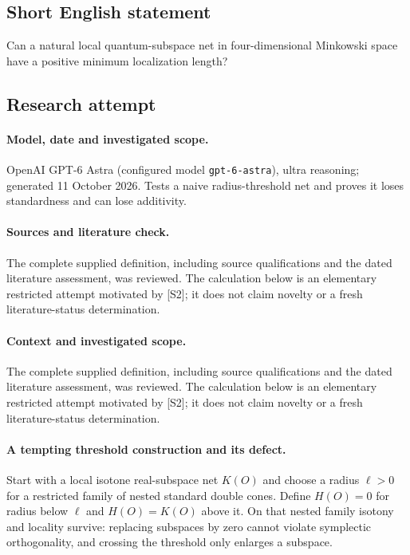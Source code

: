 \documentclass[11pt]{article}
\begin{document}
\subsection{Short English statement}
Can a natural local quantum-subspace net in four-dimensional Minkowski space have a positive minimum localization length?
\subsection{Research attempt}
\paragraph{Model, date and investigated scope.}
OpenAI GPT-6 Astra (configured model \texttt{gpt-6-astra}), ultra reasoning; generated 11 October 2026. Tests a naive radius-threshold net and proves it loses standardness and can lose additivity.

\paragraph{Sources and literature check.}
The complete supplied definition, including source qualifications and the dated literature assessment, was reviewed. The calculation below is an elementary restricted attempt motivated by [S2]; it does not claim novelty or a fresh literature-status determination.

\paragraph{Context and investigated scope.} The complete supplied definition, including source qualifications and the dated literature assessment, was reviewed. The calculation below is an elementary restricted attempt motivated by [S2]; it does not claim novelty or a fresh literature-status determination.

\paragraph{A tempting threshold construction and its defect.} Start with a local isotone real-subspace net $K(O)$ and choose a radius $\ell>0$ for a restricted family of nested standard double cones. Define $H(O)=0$ for radius below $\ell$ and $H(O)=K(O)$ above it. On that nested family isotony and locality survive: replacing subspaces by zero cannot violate symplectic orthogonality, and crossing the threshold only enlarges a subspace.
\end{document}
